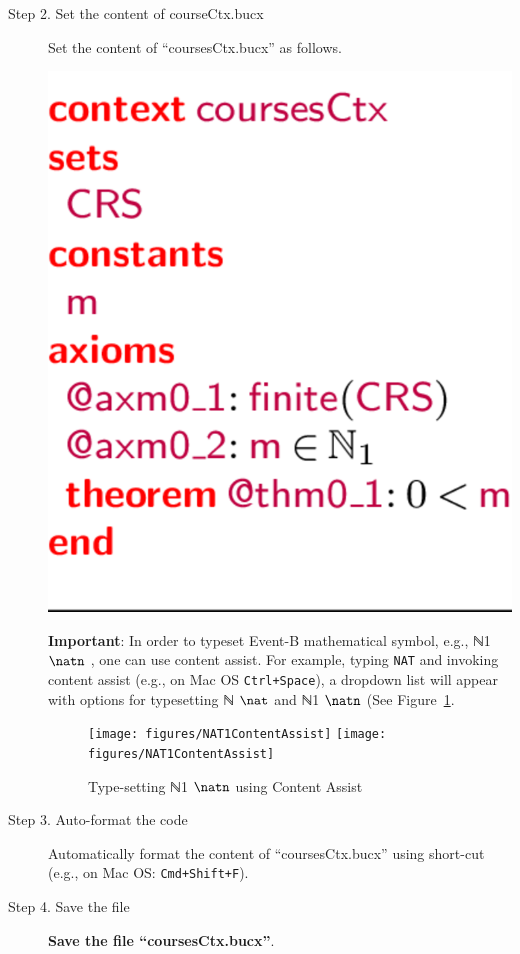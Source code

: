\begin{description}
\item[Step 2. Set the content of courseCtx.bucx] Set the content of ``coursesCtx.bucx'' as follows.
  \begin{center}
      \includegraphics{figures/xeventb-coursesCtx}
      \else
      
      \endif
  \end{center}
  \textbf{Important}: In order to typeset Event-B mathematical symbol, e.g.,  ℕ1 \else $\natn$ \endif, one can use content assist. For example, typing \texttt{NAT} and invoking content assist (e.g., on Mac OS \texttt{Ctrl+Space}), a dropdown list will appear with options for typesetting  ℕ \else $\nat$ \endif and  ℕ1 \else $\natn$ \endif (See Figure~\ref{fig:NAT1ContentAssist}.
  \begin{figure}[!htbp]
    \centering
    \texttt{[image: figures/NAT1ContentAssist]}
    \else
    \texttt{[image: figures/NAT1ContentAssist]}
    \endif
    \caption{Type-setting  ℕ1 \else $\natn$ \endif using Content Assist}
    \label{fig:NAT1ContentAssist}
  \end{figure}

\item[Step 3. Auto-format the code] Automatically format the content of ``coursesCtx.bucx'' using short-cut (e.g., on Mac OS: \texttt{Cmd+Shift+F}).

\item[Step 4. Save the file] \textbf{Save the file ``coursesCtx.bucx''}.
\end{description}
